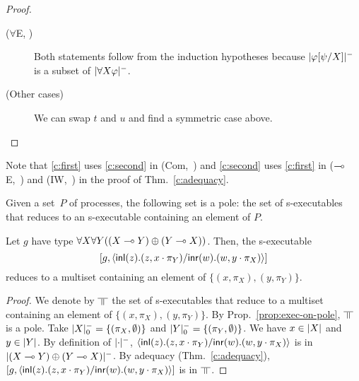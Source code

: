 \begin{proof}
\begin{description}
\begin{enumerate}[label=\textit{(\arabic{*})}]
       \end{enumerate}
  \item[($\forall$E, \textminus)]
       Both statements follow from the induction hypotheses
       because $|{\varphi[\psi/X]}|^-$ is a subset of $|{\forall
       X\varphi}|^-$.
   \item[(Other cases)]
	We can swap $t$ and $u$ and find a symmetric case above.
 \end{description}
 \end{proof}
Note that \ref{c:first} uses \ref{c:second} in (Com,~\textminus)
and \ref{c:second} uses \ref{c:first} in ($\multimap$E,~\textminus) and
(IW,~\textminus) in the proof of Thm.~\ref{c:adequacy}.

\begin{proposition}
 \label{prop:exec-on-pole}
 Given a set~$P$ of processes,
 the following set is a pole: the set of s-executables that reduces to
 an s-executable containing an element of $P$.
\end{proposition}

\begin{proposition}
 \label{spec:prelin}
 Let $g$ have type ${\forall X\forall
 Y((X\multimap Y)\oplus (Y\multimap X))}$.
 Then, the s-executable
 \[
 [g, \langle \mathsf{inl}({z}). ({z},{x\cdot\pi_Y})/ \mathsf{inr}({w}). ({w},{y\cdot\pi_X})\rangle]
 \]
 reduces to a multiset containing an element of
 $\{(x,\pi_X), (y,\pi_Y)\}$.
\end{proposition}
\begin{proof}
 We denote by $\bbot$ the set of s-executables that reduce to a multiset
 containing an element of $\{(x,\pi_X), (y,\pi_Y)\}$.
 By Prop.~\ref{prop:exec-on-pole}, $\bbot$ is a pole.
 Take $|{X}|^-_0 = \{(\pi_X,\emptyset)\}$ and
      $|{Y}|^-_0 = \{(\pi_Y,\emptyset)\}$.
 We have $x\in|{X}|$ and $y\in|{Y}|$.
 By definition of $|{\cdot}|^-$,
 $\langle \mathsf{inl}({z}). ({z},{x\cdot\pi_Y})/ \mathsf{inr}({w}). ({w},{y\cdot\pi_X})\rangle$ is in $|{(X\multimap
 Y)\oplus (Y\multimap X)}|^-$\kern -1.5pt.
 By adequacy (Thm.~\ref{c:adequacy}), $\left[g,
 \langle \mathsf{inl}({z}). ({z},{x\cdot\pi_Y})/ \mathsf{inr}({w}). ({w},{y\cdot\pi_X})\rangle\right]$ is in $\bbot$.
\end{proof}

